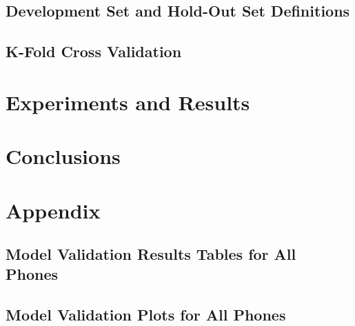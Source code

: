 \documentclass[11pt,a4paper]{tesis}
\begin{document}
		\section{Development Set and Hold-Out Set Definitions}
			
		\section{K-Fold Cross Validation}
			

	\chapter{Experiments and Results}
		

	\chapter{Conclusions}
		
		

	\chapter{Appendix}
		
		\section{Model Validation Results Tables for All Phones} \label{section:tables}
			
		\section{Model Validation Plots for All Phones} \label{section:plots}
			

	\printbibliography
\end{document}
